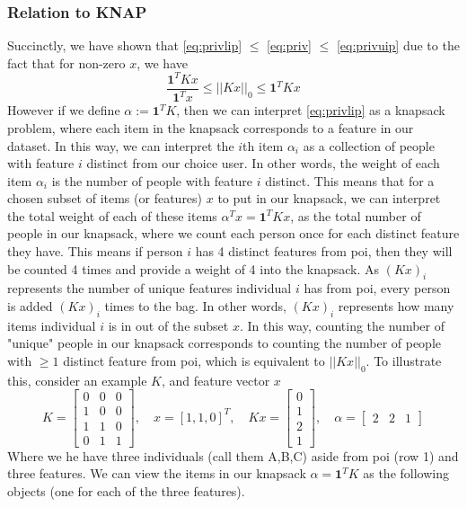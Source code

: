 \documentclass[12pt]{article}
\begin{document}
\subsubsection{Relation to \gls{KNAP}}
Succinctly, we have shown that \ref{eq:privlip} $\leq$ \ref{eq:priv} $\leq$ \ref{eq:privuip} due to the fact that for non-zero $x$, we have \[\frac{\mathbf{1}^TKx}{\mathbf{1}^Tx} \leq ||Kx||_0 \leq \mathbf{1}^TKx\]
However if we define $\alpha := \mathbf{1}^TK$, then we can interpret \ref{eq:privlip} as a knapsack problem, where each item in the knapsack corresponds to a feature in our dataset. In this way, we can interpret the $i$th item $\alpha_i$ as a collection of people with feature $i$ distinct from our choice user. In other words, the weight of each item $\alpha_i$ is the number of people with feature $i$ distinct. This means that for a chosen subset of items (or features) $x$ to put in our knapsack, we can interpret the total weight of each of these items $\alpha^T x = \mathbf{1}^TKx$, as the total number of people in our knapsack, where we count each person once for each distinct feature they have. This means if person $i$ has 4 distinct features from \gls{poi}, then they will be counted 4 times and provide a weight of 4 into the knapsack. As $(Kx)_i$ represents the number of unique features individual $i$ has from \gls{poi}, every person is added $(Kx)_i$ times to the bag. In other words, $(Kx)_i$ represents how many items individual $i$ is in out of the subset $x$. In this way, counting the number of "unique" people in our knapsack corresponds to counting the number of people with $\geq 1$ distinct feature from \gls{poi}, which is equivalent to $||Kx||_0$. To illustrate this, consider an example $K$, and feature vector $x$ 
\[K = \begin{bmatrix}
    0&0&0 \\
    1&0&0 \\
    1&1&0\\
    0&1&1
\end{bmatrix}, \quad x = [1,1,0]^T, \quad Kx = \begin{bmatrix}
    0\\1\\2\\1
\end{bmatrix}, \quad \alpha = \begin{bmatrix}
    2&2&1
\end{bmatrix}\]
Where we he have three individuals (call them A,B,C) aside from \gls{poi} (row 1) and three features. We can view the items in our knapsack $\alpha = \mathbf{1}^TK$ as the following objects (one for each of the three features).
\end{document}

